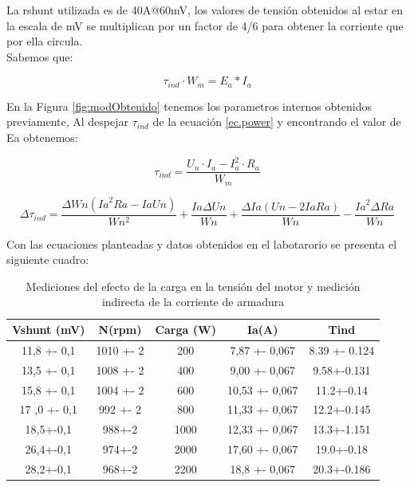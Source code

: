 \documentclass[11pt,letterpaper]{article}     %
\begin{document}
		La rshunt utilizada es de 40A@60mV, los valores de tensión obtenidos al estar en la escala de mV se multiplican por un factor de 4/6 para obtener la corriente que por ella circula.\\
		
		Sabemos que:
		
		\begin{equation}
			\tau_{ind}\cdot W_m = E_a*I_a 
			\label{ec.power}
		\end{equation}
		
		En la Figura \ref{fig:modObtenido} tenemos los parametros internos obtenidos previamente, Al despejar $\tau_{ind}$ de la ecuación \ref{ec.power} y encontrando el valor de Ea obtenemos:
		
		\begin{equation}
			\tau_{ind}=\frac{U_n\cdot I_a-I_a^2\cdot R_a}{W_m}
		\end{equation}
		
		\begin{equation}
		\Delta \tau_{ind}=	\frac{\Delta Wn {\left({Ia}^2  Ra-Ia Un\right)}}{Wn^{2}}+\frac{Ia \Delta Un}{Wn}+\frac{ \Delta Ia {\left({Un}-2 {Ia} {Ra}\right)}}{{Wn}}-\frac{{Ia}^2 {\Delta Ra}}{Wn}
		\end{equation}
		
		Con las ecuaciones planteadas y datos obtenidos en el labotarorio se presenta el siguiente cuadro:
	\begin{table}[H]
		\centering
			\caption{Mediciones del efecto de la carga en la tensión del motor y medición indirecta de la corriente de armadura}
		\begin{tabular}{|c|c|c|c|c|}
			\hline
			Vshunt (mV) & N(rpm) & Carga (W) &Ia(A)& Tind\\ \hline
			11,8 +- 0,1 & 1010 +- 2 & 200 & 7,87 +- 0,067&8.39 +- 0.124\\ \hline
			13,5 +- 0,1 & 1008 +- 2 & 400 & 9,00 +- 0,067&9.58+-0.131\\ \hline
			15,8 +- 0,1 & 1004 +- 2 & 600 & 10,53 +- 0,067&11.2+-0.14\\ \hline
			17 ,0 +- 0,1 & 992 +- 2 & 800 & 11,33 +- 0,067& 12.2+-0.145\\ \hline
			18,5+-0,1 & 988+-2 & 1000 & 12,33 +- 0,067& 13.3+-1.151\\ \hline
			26,4+-0,1 & 974+-2 & 2000 & 17,60 +- 0,067&19.0+-0.18\\ \hline
			28,2+-0,1 & 968+-2 & 2200 & 18,8 +- 0,067&20.3+-0.186\\ \hline
		\end{tabular}
	\end{table}
	
\end{document}
